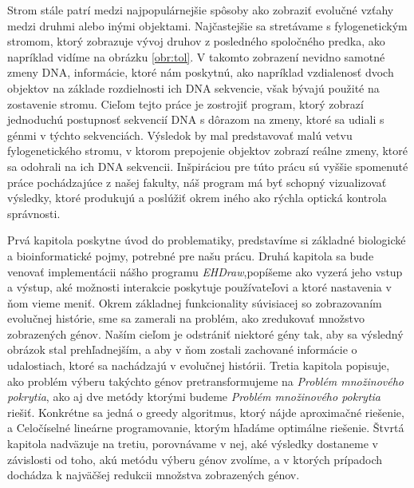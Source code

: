 Strom stále patrí medzi najpopulárnejšie spôsoby ako zobraziť evolučné vzťahy medzi druhmi alebo inými objektami.
Najčastejšie sa stretávame s fylogenetickým stromom, ktorý zobrazuje vývoj druhov z posledného spoločného predka, ako napríklad vidíme na obrázku \ref{obr:tol}.
V takomto zobrazení nevidno samotné zmeny DNA, informácie, ktoré nám poskytnú, 
ako napríklad vzdialenosť dvoch objektov na základe rozdielnosti ich DNA sekvencie, však bývajú použité na zostavenie stromu.
Cieľom tejto práce je zostrojiť program, ktorý zobrazí jednoduchú postupnosť sekvencií DNA s dôrazom na zmeny, ktoré sa udiali s génmi v týchto sekvenciách.
Výsledok by mal predstavovať malú vetvu fylogenetického stromu, v ktorom prepojenie objektov zobrazí reálne zmeny, ktoré sa odohrali na ich DNA sekvencii.
Inšpiráciou pre túto prácu sú vyššie spomenuté práce pochádzajúce z našej fakulty,
náš program má byť schopný vizualizovať výsledky, ktoré produkujú a poslúžiť okrem iného ako rýchla optická kontrola správnosti.

Prvá kapitola poskytne úvod do problematiky, predstavíme si základné biologické a bioinformatické pojmy, potrebné pre našu prácu.
Druhá kapitola sa bude venovať implementácii nášho programu \emph{EHDraw},popíšeme ako vyzerá jeho vstup a výstup,
aké možnosti interakcie poskytuje používateľovi a ktoré nastavenia v ňom vieme meniť.
Okrem základnej funkcionality súvisiacej so zobrazovaním evolučnej histórie, sme sa zamerali na problém,
ako zredukovať množstvo zobrazených génov. Naším cieľom je odstrániť niektoré gény tak, aby sa výsledný obrázok stal prehľadnejším, 
a aby v ňom zostali zachované informácie o udalostiach, ktoré sa nachádzajú v evolučnej histórii.
Tretia kapitola popisuje, ako problém výberu takýchto génov pretransformujeme na \emph{Problém množinového pokrytia},
ako aj dve metódy ktorými budeme \emph{Problém množinového pokrytia} riešiť. Konkrétne sa jedná o greedy algoritmus, ktorý nájde aproximačné riešenie,
a Celočíselné lineárne programovanie, ktorým hľadáme optimálne riešenie.
Štvrtá kapitola nadväzuje na tretiu, porovnávame v nej, aké výsledky dostaneme v závislosti od toho, akú metódu výberu génov zvolíme,
a v ktorých prípadoch dochádza k najväčšej redukcii množstva zobrazených génov. 
